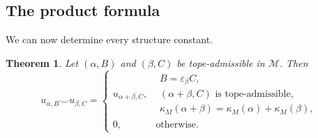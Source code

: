 \documentclass[10pt]{amsart}
\theoremstyle{plain}
\newtheorem{theorem}{Theorem}[section]
\theoremstyle{definition}
\newcommand{\M}{\mathcal{M}}
\newcommand{\eps}{\varepsilon}
\begin{document}
\subsection{The product formula}

We can now determine every structure constant.

\begin{theorem}\label{product-formula}
Let $(\alpha,B)$ and $(\beta,C)$ be tope-admissible in $\M$. Then
\begin{equation}\label{product-eq}
u_{\alpha,B}\smile u_{\beta,C}=\begin{cases}
 u_{\alpha+\beta,C}, &\begin{array}{l}
       B=\eps_\beta C,\\
       (\alpha+\beta,C)\text{ is tope-admissible},\\
       \kappa_M(\alpha+\beta)=\kappa_M(\alpha)+\kappa_M(\beta),
 \end{array}\\[6mm]
 0,&\text{otherwise}.
 \end{cases}
\end{equation}
\end{theorem}
\end{document}
